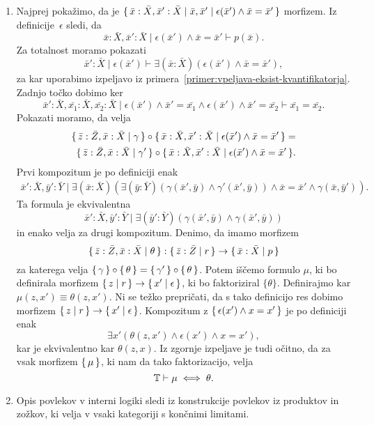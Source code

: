 \documentclass[../kategoricna_logika.tex]{subfiles}
\begin{document}
\begin{dokaz}
\begin{enumerate}[label=(\roman*)]
  \item Najprej pokažimo, da je
    $\lbrace\,\bar{x}:\bar{X}, \bar{x}':\bar{X} \mid \bar{x},\bar{x}' \mid \epsilon(\bar{x}') \land \bar{x} = \bar{x}'\,\rbrace$
    morfizem.  Iz
    definicije~$\epsilon$ sledi, da
    $$\bar{x}:\bar{X}, \bar{x}':\bar{X} \mid \epsilon(\bar{x}') \land \bar{x} = \bar{x}' \vdash p(\bar{x}).$$
    Za totalnost moramo pokazati
    \[\bar{x}':\bar{X} \mid \epsilon(\bar{x}') \vdash \exists (\bar{x}:\bar{X}) (\epsilon(\bar{x}') \land \bar{x}=\bar{x}'),\]
    za kar uporabimo izpeljavo iz primera~\ref{primer:vpeljava-eksist-kvantifikatorja}.
    Zadnjo točko dobimo ker
    \[\bar{x}':\bar{X},\bar{x_1}:\bar{X},\bar{x_2}:\bar{X} \mid \epsilon(\bar{x}') \land \bar{x}'=\bar{x_1} \land \epsilon(\bar{x}') \land \bar{x}'= \bar{x_2}
      \vdash \bar{x_1} = \bar{x_2}.\]
    Pokazati moramo, da velja
\begin{align*}
    \lbrace\,\bar{z}:\bar{Z},\bar{x}:\bar{X} \mid \gamma\,\rbrace \circ
  \lbrace\,\bar{x}:\bar{X},\bar{x}':\bar{X} \mid \epsilon(\bar{x}') \land \bar{x} = \bar{x}'\,\rbrace = \\
  \lbrace\,\bar{z}:\bar{Z},\bar{x}:\bar{X} \mid \gamma'\,\rbrace
  \circ \lbrace\,\bar{x}:\bar{X},\bar{x}':\bar{X} \mid \epsilon(\bar{x}') \land \bar{x} = \bar{x}'\,\rbrace.
  \end{align*}
    Prvi kompozitum je po
    definiciji enak
\begin{align*}
    \bar{x}':\bar{X},\bar{y}':\bar{Y} \mid \exists (\bar{x}:\bar{X})( \exists (\bar{y}:\bar{Y})(\gamma(\bar{x}',\bar{y}) \land \gamma'(\bar{x}',\bar{y})) \land \bar{x} = \bar{x}' \land \gamma(\bar{x},\bar{y}')).
  \end{align*}
  Ta formula je
  ekvivalentna
  $$\bar{x}':\bar{X},\bar{y}':\bar{Y} \mid \exists (\bar{y}':\bar{Y})(\gamma(\bar{x}',\bar{y}) \land \gamma(\bar{x}',\bar{y}))$$
  in enako velja za drugi kompozitum.  Denimo, da imamo morfizem
    \[\lbrace\,\bar{z}:\bar{Z},\bar{x}:\bar{X} \mid \theta\,\rbrace : \lbrace\,\bar{z}:\bar{Z} \mid r\,\rbrace \to \lbrace\,\bar{x}:\bar{X} \mid p\,\rbrace\]
    za katerega velja
    $\lbrace\,\gamma\,\rbrace \circ \lbrace\,\theta\,\rbrace = \lbrace\,\gamma'\,\rbrace \circ
    \lbrace\,\theta\,\rbrace$.  Potem iščemo formulo $\mu$, ki bo definirala
    morfizem $\lbrace\,z \mid r\,\rbrace \to \lbrace\,x' \mid \epsilon\,\rbrace$, ki bo
    faktoriziral $\{ \theta\}$.  Definirajmo kar
    $\mu(z,x') \equiv \theta(z,x')$. Ni se težko prepričati, da s tako
    definicijo res dobimo morfizem
    $\lbrace\,z \mid r\,\rbrace \to \lbrace\,x' \mid \epsilon\,\rbrace$.  Kompozitum z
    $\lbrace\,\epsilon(x') \land x = x'\,\rbrace$ je po definiciji enak
    \[ \exists x' (\theta(z,x') \land \epsilon(x') \land x=x'),\] kar
    je ekvivalentno kar $\theta(z,x)$.  Iz
    zgornje izpeljave je tudi očitno, da za vsak morfizem $\lbrace\,\mu\,\rbrace$,
    ki nam da tako faktorizacijo, velja
    \[\mathbb{T} \vdash \mu \iff \theta.\]

  \item Opis povlekov v interni logiki sledi iz konstrukcije povlekov
    iz produktov in zožkov, ki velja v vsaki kategoriji s končnimi
    limitami.
  \end{enumerate}
\end{dokaz}
\end{document}
